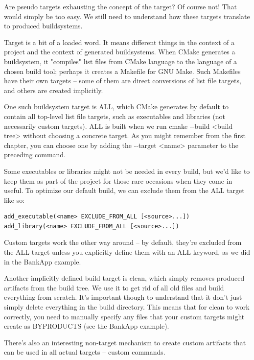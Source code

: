 Are pseudo targets exhausting the concept of the target? Of course not! That would simply be too easy. We still need to understand how these targets translate to produced buildsystems.


Target is a bit of a loaded word. It means different things in the context of a project and the context of generated buildsystems. When CMake generates a buildsystem, it "compiles" list files from CMake language to the language of a chosen build tool; perhaps it creates a Makefile for GNU Make. Such Makefiles have their own targets – some of them are direct conversions of list file targets, and others are created implicitly.

One such buildsystem target is ALL, which CMake generates by default to contain all top-level list file targets, such as executables and libraries (not necessarily custom targets). ALL is built when we run cmake -{}-build <build tree> without choosing a concrete target. As you might remember from the first chapter, you can choose one by adding the -{}-target <name> parameter to the preceding command.

Some executables or libraries might not be needed in every build, but we'd like to keep them as part of the project for those rare occasions when they come in useful. To optimize our default build, we can exclude them from the ALL target like so:

\begin{lstlisting}[style=styleCMake]
add_executable(<name> EXCLUDE_FROM_ALL [<source>...])
add_library(<name> EXCLUDE_FROM_ALL [<source>...])
\end{lstlisting}

Custom targets work the other way around – by default, they're excluded from the ALL target unless you explicitly define them with an ALL keyword, as we did in the BankApp example.

Another implicitly defined build target is clean, which simply removes produced artifacts from the build tree. We use it to get rid of all old files and build everything from scratch. It's important though to understand that it don't just simply delete everything in the build directory. This means that for clean to work correctly, you need to manually specify any files that your custom targets might create as BYPRODUCTS (see the BankApp example).

There's also an interesting non-target mechanism to create custom artifacts that can be used in all actual targets – custom commands.

